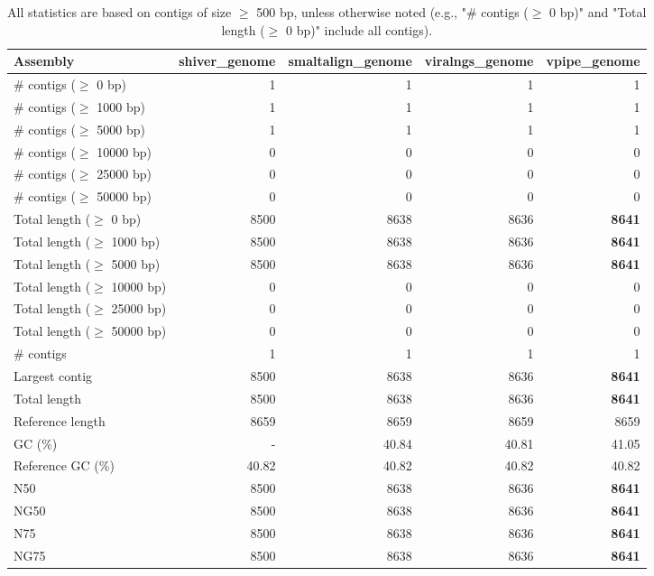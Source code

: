 \documentclass[12pt,a4paper]{article}
\begin{document}
\begin{table}[ht]
\begin{center}
\caption{All statistics are based on contigs of size $\geq$ 500 bp, unless otherwise noted (e.g., "\# contigs ($\geq$ 0 bp)" and "Total length ($\geq$ 0 bp)" include all contigs).}
\begin{tabular}{|l*{4}{|r}|}
\hline
Assembly & shiver\_genome & smaltalign\_genome & viralngs\_genome & vpipe\_genome \\ \hline
\# contigs ($\geq$ 0 bp) & 1 & 1 & 1 & 1 \\ \hline
\# contigs ($\geq$ 1000 bp) & 1 & 1 & 1 & 1 \\ \hline
\# contigs ($\geq$ 5000 bp) & 1 & 1 & 1 & 1 \\ \hline
\# contigs ($\geq$ 10000 bp) & 0 & 0 & 0 & 0 \\ \hline
\# contigs ($\geq$ 25000 bp) & 0 & 0 & 0 & 0 \\ \hline
\# contigs ($\geq$ 50000 bp) & 0 & 0 & 0 & 0 \\ \hline
Total length ($\geq$ 0 bp) & 8500 & 8638 & 8636 & {\bf 8641} \\ \hline
Total length ($\geq$ 1000 bp) & 8500 & 8638 & 8636 & {\bf 8641} \\ \hline
Total length ($\geq$ 5000 bp) & 8500 & 8638 & 8636 & {\bf 8641} \\ \hline
Total length ($\geq$ 10000 bp) & 0 & 0 & 0 & 0 \\ \hline
Total length ($\geq$ 25000 bp) & 0 & 0 & 0 & 0 \\ \hline
Total length ($\geq$ 50000 bp) & 0 & 0 & 0 & 0 \\ \hline
\# contigs & 1 & 1 & 1 & 1 \\ \hline
Largest contig & 8500 & 8638 & 8636 & {\bf 8641} \\ \hline
Total length & 8500 & 8638 & 8636 & {\bf 8641} \\ \hline
Reference length & 8659 & 8659 & 8659 & 8659 \\ \hline
GC (\%) & - & 40.84 & 40.81 & 41.05 \\ \hline
Reference GC (\%) & 40.82 & 40.82 & 40.82 & 40.82 \\ \hline
N50 & 8500 & 8638 & 8636 & {\bf 8641} \\ \hline
NG50 & 8500 & 8638 & 8636 & {\bf 8641} \\ \hline
N75 & 8500 & 8638 & 8636 & {\bf 8641} \\ \hline
NG75 & 8500 & 8638 & 8636 & {\bf 8641} \\ \hline

\end{tabular}
\end{center}
\end{table}
\end{document}
